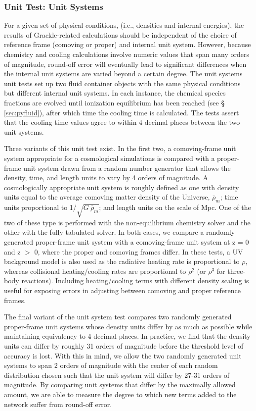 \subsubsection{Unit Test: Unit Systems}
\label{sec:unit-test}

For a given set of physical conditions, (i.e., densities and internal
energies), the results of Grackle-related calculations should be
independent of the choice of reference frame (comoving or proper) and
internal unit system.  However, because chemistry and cooling
calculations involve numeric values that span many orders of
magnitude, round-off error will eventually lead to significant
differences when the internal unit systems are varied beyond a certain
degree.  The unit systems unit tests set up two fluid container
objects with the same physical conditions but different internal unit
systems.  In each instance, the chemical species fractions are evolved
until ionization equilibrium has been reached (see \S
\ref{sec:pyfluid}), after which time the cooling time is calculated.
The tests assert that the cooling time values agree to within 4
decimal places between the two unit systems.

Three variants of this unit test exist.  In the first two, a
comoving-frame unit system appropriate for a cosmological simulations
is compared with a proper-frame unit system drawn from a random number
generator that allows the density, time, and length units to vary by 4
orders of magnitude.  A cosmologically appropriate unit system is
roughly defined as one with density units equal to the average
comoving matter density of the Universe, $\bar{\rho}_{m}$; time units
proportional to 1/$\sqrt{G\ \bar{\rho}_{m}}$; and length units on the
scale of Mpc.  One of the two of these type is performed with the
non-equilibrium chemistry solver and the other with the fully
tabulated solver.  In both cases, we compare a randomly generated
proper-frame unit system with a comoving-frame unit system at z = 0
and z $>$ 0, where the proper and comoving frames differ.  In these
tests, a UV background model is also used as the radiative heating
rate is proportional to $\rho$, whereas collisional heating/cooling
rates are proportional to $\rho^{2}$ (or $\rho^{3}$ for three-body
reactions).  Including heating/cooling terms with different density
scaling is useful for exposing errors in adjusting between comoving
and proper reference frames.

The final variant of the unit system test compares two randomly
generated proper-frame unit systems whose density units differ by as
much as possible while maintaining equivalency to 4 decimal places.
In practice, we find that the density units can differ by roughly 31
orders of magnitude before the threshold level of accuracy is lost.
With this in mind, we allow the two randomly generated unit systems to
span 2 orders of magnitude with the center of each random distribution
chosen such that the unit system will differ by 27-31 orders of
magnitude.  By comparing unit systems that differ by the maximally
allowed amount, we are able to measure the degree to which new terms
added to the network suffer from round-off error.

